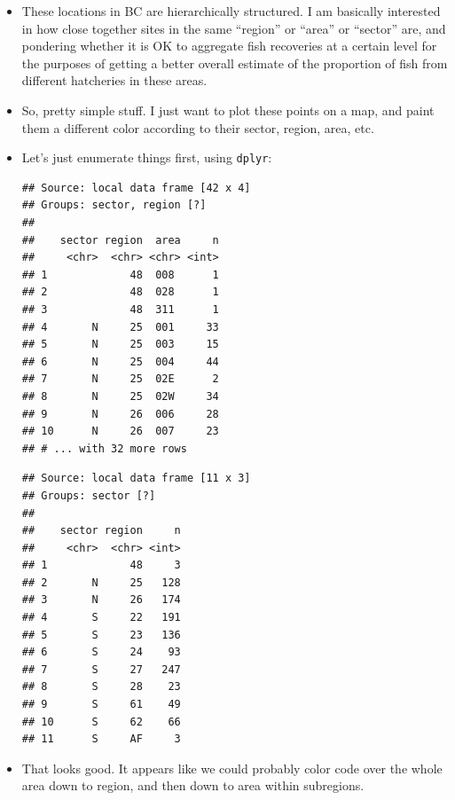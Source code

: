 \documentclass[]{book}
\newenvironment{Shaded}{\begin{snugshade}}{\end{snugshade}}
\newcommand{\KeywordTok}[1]{\textcolor[rgb]{0.13,0.29,0.53}{\textbf{{#1}}}}
\newcommand{\StringTok}[1]{\textcolor[rgb]{0.31,0.60,0.02}{{#1}}}
\newcommand{\NormalTok}[1]{{#1}}
\theoremstyle{definition}
\theoremstyle{definition}
\theoremstyle{remark}
\begin{document}
\begin{itemize}
\item
  These locations in BC are hierarchically structured. I am basically
  interested in how close together sites in the same ``region'' or
  ``area'' or ``sector'' are, and pondering whether it is OK to
  aggregate fish recoveries at a certain level for the purposes of
  getting a better overall estimate of the proportion of fish from
  different hatcheries in these areas.
\item
  So, pretty simple stuff. I just want to plot these points on a map,
  and paint them a different color according to their sector, region,
  area, etc.
\item
  Let's just enumerate things first, using \texttt{dplyr}:

\begin{Shaded}
\end{Shaded}

\begin{verbatim}
## Source: local data frame [42 x 4]
## Groups: sector, region [?]
## 
##    sector region  area     n
##     <chr>  <chr> <chr> <int>
## 1             48  008      1
## 2             48  028      1
## 3             48  311      1
## 4       N     25  001     33
## 5       N     25  003     15
## 6       N     25  004     44
## 7       N     25  02E      2
## 8       N     25  02W     34
## 9       N     26  006     28
## 10      N     26  007     23
## # ... with 32 more rows
\end{verbatim}

\begin{Shaded}
\end{Shaded}

\begin{verbatim}
## Source: local data frame [11 x 3]
## Groups: sector [?]
## 
##    sector region     n
##     <chr>  <chr> <int>
## 1             48     3
## 2       N     25   128
## 3       N     26   174
## 4       S     22   191
## 5       S     23   136
## 6       S     24    93
## 7       S     27   247
## 8       S     28    23
## 9       S     61    49
## 10      S     62    66
## 11      S     AF     3
\end{verbatim}
\item
  That looks good. It appears like we could probably color code over the
  whole area down to region, and then down to area within subregions.
\end{itemize}
\end{document}
